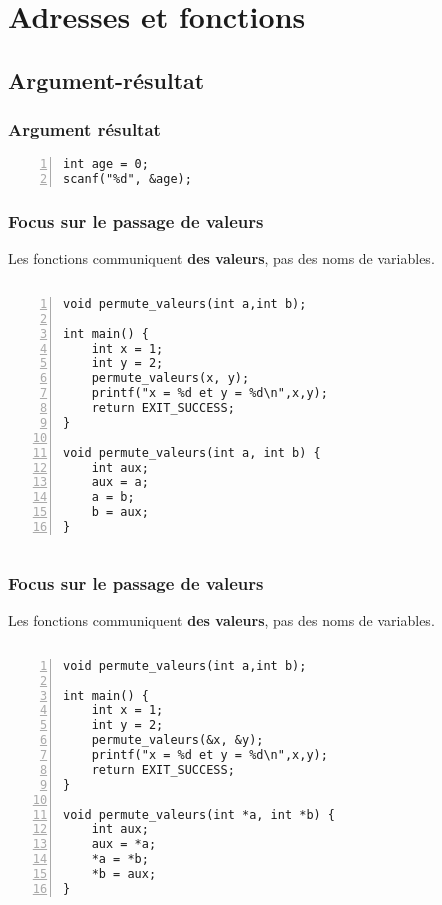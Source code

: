 \documentclass[xcolor=pdftex,svgnames,table]{beamer}
\begin{document}
\section{Adresses et fonctions}
\subsection{Argument-résultat}
\begin{frame}[fragile]
  \frametitle{Argument résultat}

\begin{lstlisting}[numbers=left,basicstyle=\ttfamily\small]
int age = 0;
scanf("%d", &age);
\end{lstlisting}
\end{frame}


\begin{frame}[fragile]
  \frametitle{Focus sur le passage de valeurs}
  Les fonctions communiquent \textbf{des valeurs}, pas des noms de
  variables.

\begin{columns}
\scriptsize
  \begin{column}[t]{3.7cm}
 \begin{lstlisting}[numbers=left,basicstyle=\ttfamily\scriptsize]
void permute_valeurs(int a,int b);

int main() {
    int x = 1;
    int y = 2;
    permute_valeurs(x, y);
    printf("x = %d et y = %d\n",x,y);
    return EXIT_SUCCESS;
}

void permute_valeurs(int a, int b) {
    int aux;
    aux = a;
    a = b;
    b = aux;
}\end{lstlisting}
\vspace{.4cm}
 \end{column}
\end{columns}
\end{frame}



\begin{frame}[fragile]
  \frametitle{Focus sur le passage de valeurs}
  Les fonctions communiquent \textbf{des valeurs}, pas des noms de
  variables.
\begin{columns}
\scriptsize
\begin{column}[t]{3.7cm}
 \begin{lstlisting}[numbers=left,basicstyle=\ttfamily\scriptsize]
void permute_valeurs(int a,int b);

int main() {
    int x = 1;
    int y = 2;
    permute_valeurs(&x, &y);
    printf("x = %d et y = %d\n",x,y);
    return EXIT_SUCCESS;
}

void permute_valeurs(int *a, int *b) {
    int aux;
    aux = *a;
    *a = *b;
    *b = aux;
}\end{lstlisting}
\vspace{.4cm}
 \end{column}
\end{columns}
\end{frame}
\end{document}
